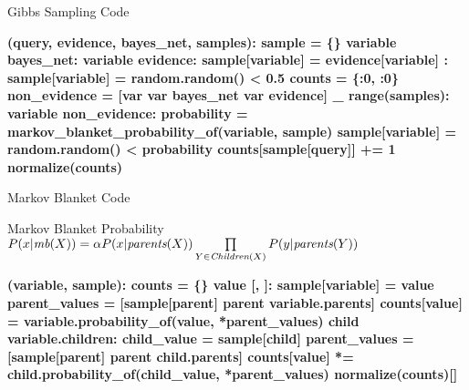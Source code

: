\documentclass[14pt]{beamer}
\begin{document}
\begin{frame}[fragile]{Gibbs Sampling Code}
\begin{semiverbatim}\scriptsize\bfseries
{} (query, evidence, bayes_net, samples):
    \pause{}
    sample = \{\}
     variable  bayes_net:
         variable  evidence:
            sample[variable] = evidence[variable]
        :
            sample[variable] = random.random() < 0.5
    \pause{}
    counts = \{:\num{0}, :\num{0}\}
    non_evidence = [var  var  bayes_net  var  evidence]
     _  range(samples):
         variable  non_evidence:
            \pause{}
            probability = markov_blanket_probability_of(variable, sample)
            sample[variable] = random.random() < probability
            counts[sample[query]] += \num{1}
    \pause{}
     normalize(counts)
\end{semiverbatim}
\end{frame}

\begin{frame}[fragile]{Markov Blanket Code}
\begin{block}{Markov Blanket Probability}
\small 
$P(x|\textit{mb}(X)) = \alpha P(x|\textit{parents}(X)) \prod\limits_{Y \in \textit{\scriptsize Children}(X)}P(y|\textit{parents}(Y))$
\end{block}
\pause
\begin{semiverbatim}\scriptsize\bfseries
{} (variable, sample):
    \pause{}
    counts = \{\}
     value  [, ]:
        \pause{}
        sample[variable] = value
        \pause{}
        parent_values = [sample[parent]  parent  variable.parents]
        counts[value] = variable.probability_of(value, *parent_values)
        \pause{}
         child  variable.children:
            child_value = sample[child]
            parent_values = [sample[parent]  parent  child.parents]
            counts[value] *= child.probability_of(child_value, *parent_values)
    \pause{}
     normalize(counts)[]
\end{semiverbatim}
\end{frame}
\end{document}
